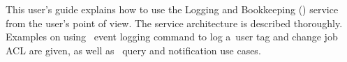 %
%
This user's guide explains how to use the Logging and Bookkeeping (\LB) service
from the user's point of view. The service architecture is described
thoroughly. Examples on using \LB\ event logging command to log a~user tag and
change job ACL are given, as well as \LB\ query and notification use cases.
